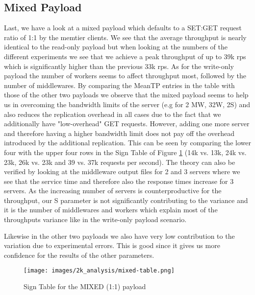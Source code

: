 \documentclass[11pt,a4paper]{article}
\begin{document}
\subsection{Mixed Payload}
Last, we have a look at a mixed payload which defaults to a SET:GET request ratio of 1:1 by the memtier clients. We see that the average throughput is nearly identical to the read-only payload but when looking at the numbers of the different experiments we see that we achieve a peak throughput of up to 39k rps which is significantly higher than the previous 33k rps. As for the write-only payload the number of workers seems to affect throughput most, followed by the number of middlewares. By comparing the MeanTP entries in the table with those of the other two payloads we observe that the mixed payload seems to help us in overcoming the bandwidth limits of the server (e.g for 2 MW, 32W, 2S) and also reduces the replication overhead in all cases due to the fact that we additionally have "low-overhead" GET requests. However, adding one more server and therefore having a higher bandwidth limit does not pay off the overhead introduced by the additional replication. This can be seen by comparing the lower four with the upper four rows in the Sign Table of Figure \ref{img:2k:mixed} (14k vs. 13k, 24k vs. 23k, 26k vs. 23k and 39 vs. 37k requests per second). The theory can also be verified by looking at the middleware output files for 2 and 3 servers where we see that the service time and therefore also the response times increase for 3 servers. As the increasing number of servers is counterproductive for the throughput, our S parameter is not significantly contributing to the variance and it is the number of middlewares and workers which explain most of the throughputs variance like in the write-only payload scenario.

Likewise in the other two payloads we also have very low contribution to the variation due to experimental errors. This is good since it gives us more confidence for the results of the other parameters.

\begin{figure}[H]
    \centering
    \texttt{[image: images/2k\_analysis/mixed-table.png]}
    \caption{Sign Table for the MIXED (1:1) payload}
    \label{img:2k:mixed}
\end{figure}
\end{document}
